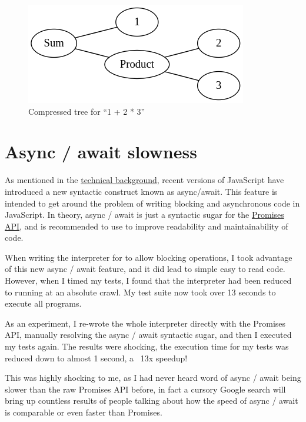 \begin{figure}
    \caption{Compressed tree for ``1 + 2 * 3''}
    \label{setanta:compressedtree}
    \begin{center}
    \includegraphics[scale=0.8]{app2assets/smallgraph}
    \end{center}
\end{figure}

\section{Async / await slowness}

As mentioned in the \hyperref[background:asyncawait]{technical background}, recent versions of JavaScript have introduced a new syntactic construct known as async/await. This feature is intended to get around the problem of writing blocking and asynchronous code in JavaScript. In theory, async / await is just a syntactic sugar for the \hyperref[background:asyncawait]{Promises API}, and is recommended to use to improve readability and maintainability of code.

When writing the interpreter for \Setanta{} to allow blocking operations, I took advantage of this new async / await feature, and it did lead to simple easy to read code. However, when I timed my tests, I found that the interpreter had been reduced to running at an absolute crawl. My test suite now took over 13 seconds to execute all programs.

As an experiment, I re-wrote the whole interpreter directly with the Promises API, manually resolving the async / await syntactic sugar, and then I executed my tests again. The results were shocking, the execution time for my tests was reduced down to almost 1 second, a ~13x speedup!

This was highly shocking to me, as I had never heard word of async / await being slower than the raw Promises API before, in fact a cursory Google search will bring up countless results of people talking about how the speed of async / await is comparable or even faster than Promises.

